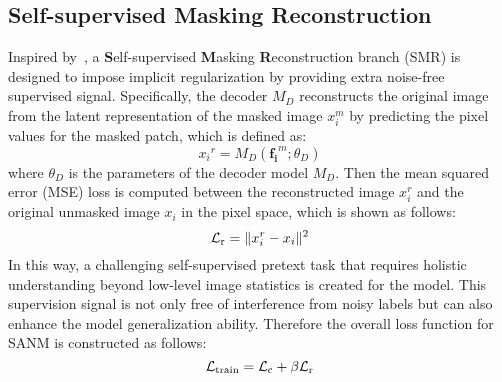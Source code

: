 \documentclass[10pt,twocolumn,letterpaper]{article}
\begin{document}
\subsection{Self-supervised Masking Reconstruction}
Inspired by~\cite{he2021masked}, a \textbf{S}elf-supervised \textbf{M}asking \textbf{R}econstruction branch (SMR) is designed to impose implicit regularization by providing extra noise-free supervised signal. Specifically, the decoder $M_D$ reconstructs the original image from the latent representation of the masked image ${x}_i ^m$ by predicting the pixel values for the masked patch, which is defined as:
\begin{equation}
{{x_i} ^{r}}=M_D({\mathbf{f_i} ^{m}};\theta_{D})
\label{eq:decode}
\end{equation}
where $\theta_{D}$ is the parameters of the decoder model $M_D$. Then the mean squared error (MSE) loss is computed between the reconstructed image ${x}_i ^r$ and the original unmasked image $x_i$ in the pixel space, which is shown as follows:
\begin{equation}
   {\mathcal{L}_{\rm r}}=\|{{x}_i ^r}-{{x}_i}\|^{2}
\end{equation}
In this way, a challenging self-supervised pretext task that requires holistic understanding beyond low-level image statistics is created for the model. {This supervision signal is not only free of interference from noisy labels but can also enhance the model generalization ability.}
Therefore the overall loss function for SANM is constructed as follows:
\begin{equation}
   {\mathcal{L}_{\rm train}}={\mathcal{L}_{\rm c}} + \beta{\mathcal{L}_{\rm r}}
   \vspace{-6mm}
\end{equation}
\end{document}
